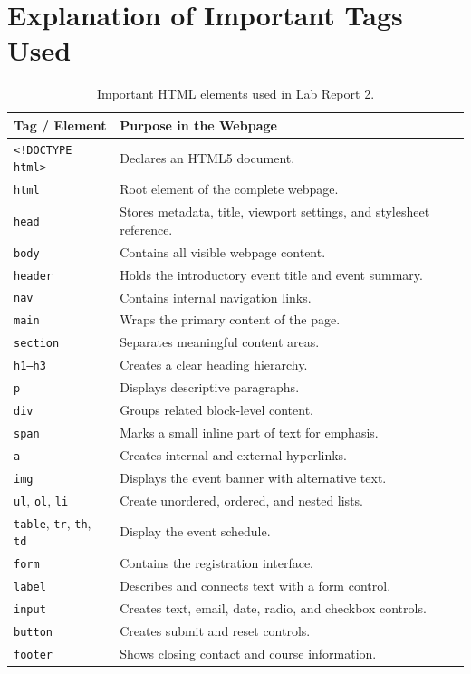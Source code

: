 \documentclass[12pt,a4paper]{article}
\begin{document}
\section{Explanation of Important Tags Used}
\begin{table}[H]\centering\small
\begin{tabular}{p{3.2cm} p{10.3cm}}
\toprule\textbf{Tag / Element} & \textbf{Purpose in the Webpage} \\
\midrule
\texttt{<!DOCTYPE html>} & Declares an HTML5 document. \\
\texttt{html} & Root element of the complete webpage. \\
\texttt{head} & Stores metadata, title, viewport settings, and stylesheet reference. \\
\texttt{body} & Contains all visible webpage content. \\
\texttt{header} & Holds the introductory event title and event summary. \\
\texttt{nav} & Contains internal navigation links. \\
\texttt{main} & Wraps the primary content of the page. \\
\texttt{section} & Separates meaningful content areas. \\
\texttt{h1--h3} & Creates a clear heading hierarchy. \\
\texttt{p} & Displays descriptive paragraphs. \\
\texttt{div} & Groups related block-level content. \\
\texttt{span} & Marks a small inline part of text for emphasis. \\
\texttt{a} & Creates internal and external hyperlinks. \\
\texttt{img} & Displays the event banner with alternative text. \\
\texttt{ul}, \texttt{ol}, \texttt{li} & Create unordered, ordered, and nested lists. \\
\texttt{table}, \texttt{tr}, \texttt{th}, \texttt{td} & Display the event schedule. \\
\texttt{form} & Contains the registration interface. \\
\texttt{label} & Describes and connects text with a form control. \\
\texttt{input} & Creates text, email, date, radio, and checkbox controls. \\
\texttt{button} & Creates submit and reset controls. \\
\texttt{footer} & Shows closing contact and course information. \\
\bottomrule
\end{tabular}\caption{Important HTML elements used in Lab Report 2.}
\end{table}
\end{document}
